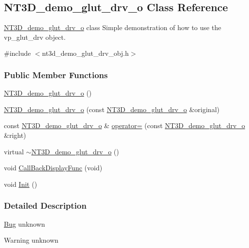 \subsection{NT3D\_\-demo\_\-glut\_\-drv\_\-o Class Reference}
\label{class_n_t3_d__demo__glut__drv__o}


\hyperlink{class_n_t3_d__demo__glut__drv__o}{NT3D\_\-demo\_\-glut\_\-drv\_\-o} class Simple demonstration of how to use the vp\_\-glut\_\-drv object.  




{\ttfamily \#include $<$nt3d\_\-demo\_\-glut\_\-drv\_\-obj.h$>$}

\subsubsection*{Public Member Functions}
\begin{DoxyCompactItemize}
\item 
\hyperlink{class_n_t3_d__demo__glut__drv__o_ac9047a45e6e7825859acc00c64c6e75a}{NT3D\_\-demo\_\-glut\_\-drv\_\-o} ()
\item 
\hyperlink{class_n_t3_d__demo__glut__drv__o_a2e0c55acb2e8923c8d95b75a5475871c}{NT3D\_\-demo\_\-glut\_\-drv\_\-o} (const \hyperlink{class_n_t3_d__demo__glut__drv__o}{NT3D\_\-demo\_\-glut\_\-drv\_\-o} \&original)
\item 
const \hyperlink{class_n_t3_d__demo__glut__drv__o}{NT3D\_\-demo\_\-glut\_\-drv\_\-o} \& \hyperlink{class_n_t3_d__demo__glut__drv__o_ac3bb5002670e277aa0d135b409188c0b}{operator=} (const \hyperlink{class_n_t3_d__demo__glut__drv__o}{NT3D\_\-demo\_\-glut\_\-drv\_\-o} \&right)
\item 
virtual \hyperlink{class_n_t3_d__demo__glut__drv__o_a580e24c585fdcd5568fafaf2c85ccd83}{$\sim$NT3D\_\-demo\_\-glut\_\-drv\_\-o} ()
\item 
void \hyperlink{class_n_t3_d__demo__glut__drv__o_a602708616d299588363bc8a0e1427e46}{CallBackDisplayFunc} (void)
\item 
void \hyperlink{class_n_t3_d__demo__glut__drv__o_af10b7e20bc9feab0519c5f39022c0ab0}{Init} ()
\end{DoxyCompactItemize}


\subsubsection{Detailed Description}
\begin{Desc}
\item[\hyperlink{bug__bug000001}{Bug}]unknown \end{Desc}
\begin{DoxyWarning}{Warning}
unknown 
\end{DoxyWarning}


